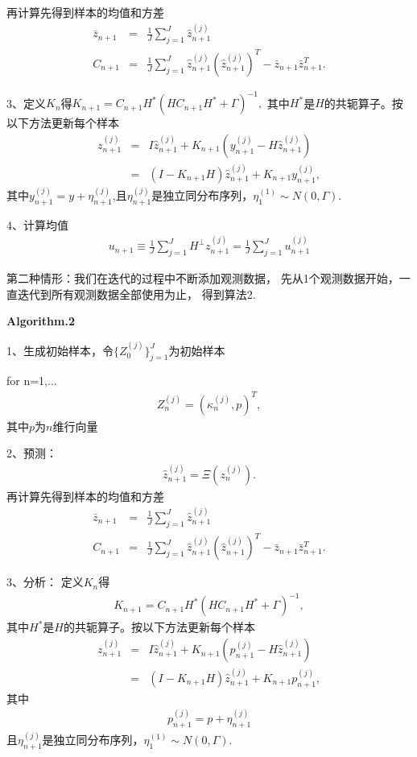 \documentclass[a4paper,12pt,oneside,CJK]{cctbook}
\theoremstyle{definition}
\numberwithin{equation}{section}
\begin{document}
再计算先得到样本的均值和方差
\begin{eqnarray*}
    \bar{z}_{n+1}&=&\frac{1}{J}\sum_{j=1}^J \hat{z}_{n+1}^{(j)}\\
    C_{n+1}&=&\frac{1}{J}\sum_{j=1}^J \hat{z}_{n+1}^{(j)}(\hat{z}_{n+1}^{(j)})^T-\bar{z}_{n+1} \bar{z}_{n+1}^T.
\end{eqnarray*}

3、定义$K_n$得$K_{n+1}=C_{n+1}H^*(H C_{n+1}H^*+\Gamma)^{-1},$
其中$H^*$是$H$的共轭算子。按以下方法更新每个样本
\begin{eqnarray*}
   z_{n+1}^{(j)}&=&I \hat{z}_{n+1}^{(j)}+K_{n+1}(y_{n+1}^{(j)}-H\hat{z}_{n+1}^{(j)})\\
                &=&(I-K_{n+1}H)\hat{z}_{n+1}^{(j)}+K_{n+1}y_{n+1}^{(j)},
\end{eqnarray*}
其中$y_{n+1}^{(j)}=y+\eta_{n+1}^{(j)}$,且$\eta_{n+1}^{(j)}$是独立同分布序列，$\eta_1^{(1)}\sim N(0,\Gamma)$.

4、计算均值
\begin{eqnarray*}
   u_{n+1}\equiv \frac{1}{J}\sum_{j=1}^J H^{\perp} z_{n+1}^{(j)}=\frac{1}{J}\sum_{j=1}^J u_{n+1}^{(j)}
\end{eqnarray*}

第二种情形：我们在迭代的过程中不断添加观测数据，
先从1个观测数据开始，一直迭代到所有观测数据全部使用为止，
得到算法2.

\textbf{Algorithm.2}

1、生成初始样本，令$\{Z_0^{(j)}\}_{j=1}^J $为初始样本

for n=1,...
\begin{eqnarray*}
    Z_n^{(j)}=(\kappa_n^{(j)},p)^T,
\end{eqnarray*}
其中$p$为$n$维行向量

2、预测：
\begin{eqnarray*}
    \hat{z}_{n+1}^{(j)}=\Xi (z_{n}^{(j)}).
\end{eqnarray*}
再计算先得到样本的均值和方差
\begin{eqnarray*}
    \bar{z}_{n+1}&=&\frac{1}{J}\sum_{j=1}^J \hat{z}_{n+1}^{(j)}\\
    C_{n+1}&=&\frac{1}{J}\sum_{j=1}^J \hat{z}_{n+1}^{(j)}(\hat{z}_{n+1}^{(j)})^T-\bar{z}_{n+1} \bar{z}_{n+1}^T.
\end{eqnarray*}

3、分析：
定义$K_n$得
\begin{eqnarray*}
    K_{n+1}=C_{n+1}H^*(H C_{n+1}H^*+\Gamma)^{-1},
\end{eqnarray*}
其中$H^*$是$H$的共轭算子。按以下方法更新每个样本
\begin{eqnarray*}
   z_{n+1}^{(j)}&=&I \hat{z}_{n+1}^{(j)}+K_{n+1}(p_{n+1}^(j)-H\hat{z}_{n+1}^{(j)})\\
                &=&(I-K_{n+1}H)\hat{z}_{n+1}^{(j)}+K_{n+1}p_{n+1}^{(j)},
\end{eqnarray*}
其中
\begin{eqnarray*}
   p_{n+1}^{(j)}=p+\eta_{n+1}^{(j)}
\end{eqnarray*}
且$\eta_{n+1}^{(j)}$是独立同分布序列，$\eta_1^{(1)}\sim N(0,\Gamma)$.
\end{document}
